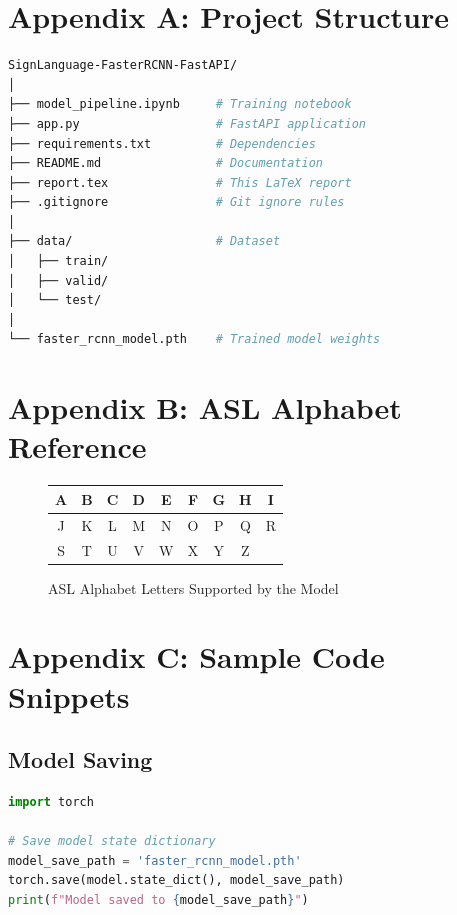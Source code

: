 \documentclass[12pt,a4paper]{article}
\begin{document}
\newpage
\appendix
\section{Appendix A: Project Structure}

\begin{lstlisting}[language=bash, caption=Complete Project Structure]
SignLanguage-FasterRCNN-FastAPI/
│
├── model_pipeline.ipynb     # Training notebook
├── app.py                   # FastAPI application
├── requirements.txt         # Dependencies
├── README.md                # Documentation
├── report.tex               # This LaTeX report
├── .gitignore               # Git ignore rules
│
├── data/                    # Dataset
│   ├── train/
│   ├── valid/
│   └── test/
│
└── faster_rcnn_model.pth    # Trained model weights
\end{lstlisting}

\section{Appendix B: ASL Alphabet Reference}

\begin{figure}[H]
    \centering
    \begin{tabular}{|*{9}{c|}}
        \hline
        A & B & C & D & E & F & G & H & I \\
        \hline
        J & K & L & M & N & O & P & Q & R \\
        \hline
        S & T & U & V & W & X & Y & Z & \\
        \hline
    \end{tabular}
    \caption{ASL Alphabet Letters Supported by the Model}
    \label{fig:asl_alphabet}
\end{figure}

\section{Appendix C: Sample Code Snippets}

\subsection{Model Saving}

\begin{lstlisting}[language=python, caption=Saving the Trained Model]
import torch

# Save model state dictionary
model_save_path = 'faster_rcnn_model.pth'
torch.save(model.state_dict(), model_save_path)
print(f"Model saved to {model_save_path}")
\end{lstlisting}
\end{document}
